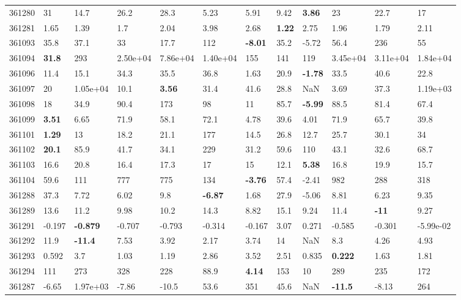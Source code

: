 \begin{table}[ht!]
\begin{tabular}{llllllllllll}
  361280 & 31 & 14.7 & 26.2 & 28.3 & 5.23 & 5.91 & 9.42 & \textbf{3.86} & 23 & 22.7 & 17 \\ 
  361281 & 1.65 & 1.39 & 1.7 & 2.04 & 3.98 & 2.68 & \textbf{1.22} & 2.75 & 1.96 & 1.79 & 2.11 \\ 
  361093 & 35.8 & 37.1 & 33 & 17.7 & 112 & \textbf{-8.01} & 35.2 & -5.72 & 56.4 & 236 & 55 \\ 
  361094 & \textbf{31.8} & 293 &  2.50e+04 &  7.86e+04 &  1.40e+04 & 155 & 141 & 119 &  3.45e+04 &  3.11e+04 &  1.84e+04 \\ 
  361096 & 11.4 & 15.1 & 34.3 & 35.5 & 36.8 & 1.63 & 20.9 & \textbf{-1.78} & 33.5 & 40.6 & 22.8 \\ 
  361097 & 20 &  1.05e+04 & 10.1 & \textbf{3.56} & 31.4 & 41.6 & 28.8 & NaN & 3.69 & 37.3 &  1.19e+03 \\ 
  361098 & 18 & 34.9 & 90.4 & 173 & 98 & 11 & 85.7 & \textbf{-5.99} & 88.5 & 81.4 & 67.4 \\ 
  361099 & \textbf{3.51} & 6.65 & 71.9 & 58.1 & 72.1 & 4.78 & 39.6 & 4.01 & 71.9 & 65.7 & 39.8 \\ 
  361101 & \textbf{1.29} & 13 & 18.2 & 21.1 & 177 & 14.5 & 26.8 & 12.7 & 25.7 & 30.1 & 34 \\ 
  361102 & \textbf{20.1} & 85.9 & 41.7 & 34.1 & 229 & 31.2 & 59.6 & 110 & 43.1 & 32.6 & 68.7 \\ 
  361103 & 16.6 & 20.8 & 16.4 & 17.3 & 17 & 15 & 12.1 & \textbf{5.38} & 16.8 & 19.9 & 15.7 \\ 
  361104 & 59.6 & 111 & 777 & 775 & 134 & \textbf{-3.76} & 57.4 & -2.41 & 982 & 288 & 318 \\ 
  361288 & 37.3 & 7.72 & 6.02 & 9.8 & \textbf{-6.87} & 1.68 & 27.9 & -5.06 & 8.81 & 6.23 & 9.35 \\ 
  361289 & 13.6 & 11.2 & 9.98 & 10.2 & 14.3 & 8.82 & 15.1 & 9.24 & 11.4 & \textbf{-11} & 9.27 \\ 
  361291 & -0.197 & \textbf{-0.879} & -0.707 & -0.793 & -0.314 & -0.167 & 3.07 & 0.271 & -0.585 & -0.301 & -5.99e-02 \\ 
  361292 & 11.9 & \textbf{-11.4} & 7.53 & 3.92 & 2.17 & 3.74 & 14 & NaN & 8.3 & 4.26 & 4.93 \\ 
  361293 & 0.592 & 3.7 & 1.03 & 1.19 & 2.86 & 3.52 & 2.51 & 0.835 & \textbf{0.222} & 1.63 & 1.81 \\ 
  361294 & 111 & 273 & 328 & 228 & 88.9 & \textbf{4.14} & 153 & 10 & 289 & 235 & 172 \\ 
  361287 & -6.65 &  1.97e+03 & -7.86 & -10.5 & 53.6 & 351 & 45.6 & NaN & \textbf{-11.5} & -8.13 & 264 \\ 

\end{tabular}
\end{table}
